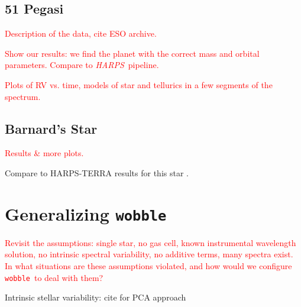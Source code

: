 \documentclass[twocolumn]{aastex62}
\newcommand{\todo}[1]{\textcolor{red}{#1}}  %
\newcommand{\acronym}[1]{{\small{#1}}}
\newcommand{\project}[1]{\textsl{#1}}
\newcommand{\code}[1]{\texttt{#1}}
\newcommand{\HARPS}{\project{\acronym{HARPS}}}
\newcommand{\wobble}{\code{wobble}}
\newcommand{\Mdwarf}{Barnard's Star}
\begin{document}
\subsection{51 Pegasi}

\todo{Description of the data, cite \acronym{ESO} archive.}

\todo{Show our results: we find the planet with the correct mass and orbital parameters. Compare to \HARPS\ pipeline.}

\todo{Plots of RV vs. time, models of star and tellurics in a few segments of the spectrum.}

\subsection{\Mdwarf}

\todo{Results \& more plots.}

Compare to HARPS-TERRA results for this star \citep{AngladaEscude2012}.

\section{Generalizing \wobble}
\label{s:future}

\todo{Revisit the assumptions: single star, no gas cell, known instrumental wavelength solution, no intrinsic spectral variability, no additive terms, many spectra exist. 
In what situations are these assumptions violated, and how would we configure \wobble\ to deal with them?}

Intrinsic stellar variability: cite \citet{Davis2017} for PCA approach


\end{document}
